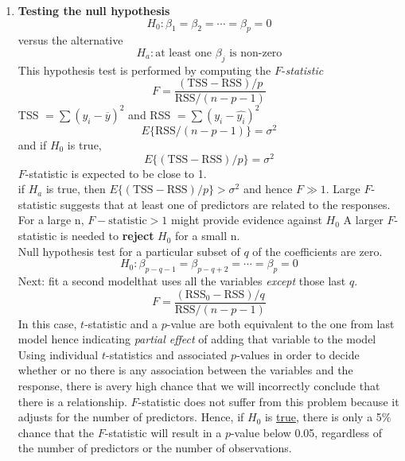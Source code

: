 \documentclass{article}
\begin{document}
\begin{enumerate}
    \item {} \textbf{Testing the null hypothesis} \\ \begin{equation*} H_0: \beta_1 = \beta_2 = \cdots = \beta_p = 0 \end{equation*}
    versus the alternative \begin{equation*} H_a: \text{at least one } \beta_j \text{ is non-zero} \end{equation*}
    This hypothesis test is performed by computing the $F$-\textit{statistic} 
    \begin{equation*} F = \frac{(\text{TSS}-\text{RSS})/{p}}{\text{RSS}/(n-p-1)} \end{equation*}
    TSS $= \sum {(y_i-\overline{y})}^2$ and RSS $= \sum {(y_i - \hat{y_i})}^2$  \\
    \begin{equation*} E{\{\text{RSS}/(n-p-1)\}} = \sigma^2 \end{equation*}
    and if $H_0$ is true, 
    \begin{equation*} E{\{(\text{TSS}-\text{RSS})/p\}} = \sigma^2 \end{equation*}
    $F$-statistic is expected to be close to 1. \\
    if $H_a$ is true, then $E{\{(\text{TSS}-\text{RSS})/p\}} > \sigma^2$ and hence $F \gg 1$. 
    Large $F$-statistic suggests that at least one of predictors are related to the responses. 
    \\[3mm] For a large n, $F-\text{statistic} > 1$ might provide evidence against $H_0$
    A larger $F$-statistic is needed to \textbf{reject} $H_0$ for a small n. 
    \\
    Null hypothesis test for a particular subset of $q$ of the coefficients are zero.
    \begin{equation*} H_0: \beta_{p-q-1} = \beta_{p-q+2} = \cdots = \beta_p = 0 \end{equation*}
    Next: fit a second modelthat uses all the variables \textit{except} those last $q$. 
    \begin{equation*} F = \frac{(\text{RSS}_0 - \text{RSS})/q}{\text{RSS}/(n-p-1)} \end{equation*}
    In this case, $t$-statistic and a $p$-value are both equivalent to the one from last model hence indicating \textit{partial effect} of adding that variable to the model 
    \\[2mm]  Using individual $t$-statistics and associated $p$-values in order to decide whether or no there is any association between the variables and the response, there is avery high chance that we will incorrectly conclude that there is a relationship. $F$-statistic does not suffer from this problem because it adjusts for the number of predictors. Hence, if $H_0$ is \underline{true}, there is only a 5\% chance that the $F$-statistic will result in a $p$-value below 0.05, regardless of the number of predictors or the number of observations.

\end{enumerate}
\end{document}

